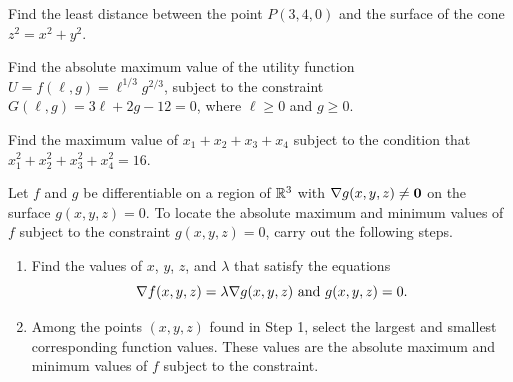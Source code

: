 \documentclass[mathNotesPreamble]{subfiles}
\begin{document}
  \begin{ex*}
    Find the least distance between the point $P(3,4,0)$ and the surface of the cone $z^2=x^2+y^2$.
  \end{ex*}
  \pagebreak

  \begin{ex*}
    Find the absolute maximum value of the utility function $U=f(\ell,g)=\ell^{1/3} g^{2/3}$, subject to the constraint $G(\ell, g)=3\ell+2g-12=0$, where $\ell\geq 0$ and $g\geq 0$.
  \end{ex*}
  \pagebreak

  \begin{ex*}
    Find the maximum value of $x_1+x_2+x_3+x_4$ subject to the condition that $x_1^2+x_2^2+x_3^2+x_4^2=16$.
  \end{ex*}
  \pagebreak

  \begin{thmBox*}
    Let $f$ and $g$ be differentiable on a region of $\mathbb{R}^3$ with $\nabla g(x,y,z)\neq \mathbf{0}$ on the surface $g(x,y,z)=0$. To locate the absolute maximum and minimum values of $f$ subject to the constraint $g(x,y,z)=0$, carry out the following steps.
    \begin{enumerate}
      \item 
        Find the values of $x$, $y$, $z$, and $\lambda$ that satisfy the equations
          \[\nabla f(x,y,z)=\lambda\nabla g(x,y,z)\textnormal{ and } g(x,y,z)=0.\]
      \item 
        Among the points $(x,y,z)$ found in Step 1, select the largest and smallest corresponding function values. These values are the absolute maximum and minimum values of $f$ subject to the constraint.
    \end{enumerate}
  \end{thmBox*}

  \pagebreak
  
\end{document}
